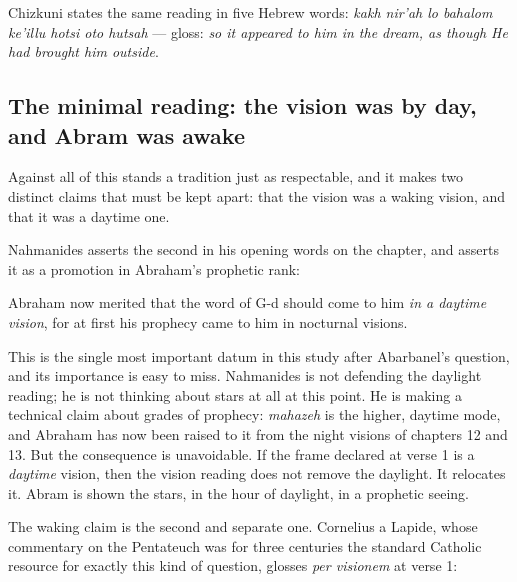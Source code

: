 Chizkuni states the same reading in five Hebrew words: \textit{kakh nir'ah lo
bahalom ke'illu hotsi oto hutsah} --- gloss: \emph{so it appeared to him in the
dream, as though He had brought him outside}.

\subsection{The minimal reading: the vision was by day, and Abram was awake}

Against all of this stands a tradition just as respectable, and it makes two
distinct claims that must be kept apart: that the vision was a waking vision,
and that it was a daytime one.

Nahmanides asserts the second in his opening words on the chapter, and asserts
it as a promotion in Abraham's prophetic rank:

\begin{studyframe}
Abraham now merited that the word of G-d should come to him \emph{in a daytime
vision}, for at first his prophecy came to him in nocturnal visions.
\end{studyframe}

This is the single most important datum in this study after Abarbanel's
question, and its importance is easy to miss. Nahmanides is not defending the
daylight reading; he is not thinking about stars at all at this point. He is
making a technical claim about grades of prophecy: \textit{mahazeh} is the
higher, daytime mode, and Abraham has now been raised to it from the night
visions of chapters 12 and 13. But the consequence is unavoidable. If the frame
declared at verse 1 is a \emph{daytime} vision, then the vision reading does not
remove the daylight. It relocates it. Abram is shown the stars, in the hour of
daylight, in a prophetic seeing.

The waking claim is the second and separate one. Cornelius a Lapide, whose
commentary on the Pentateuch was for three centuries the standard Catholic
resource for exactly this kind of question, glosses \textit{per visionem} at
verse 1:

